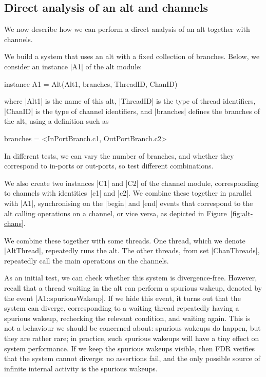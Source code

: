 \subsection{Direct analysis of an alt and channels}
\label{sec:combined}

\inlineCSP

We now describe how we can perform a direct analysis of an alt together with
channels.  




We build a system that uses an alt with a fixed collection of branches.
Below, we consider an instance |A1| of the alt module:
\begin{cspm}
instance A1 = Alt(Alt1, branches, ThreadID, ChanID)
\end{cspm}
where |Alt1| is the name of this alt, |ThreadID| is the type of thread
identifiers, |ChanID| is the type of channel identifiers, and |branches|
defines the branches of the alt,   using a definition such as
%
\begin{cspm}
branches =  <InPortBranch.c1, OutPortBranch.c2>
\end{cspm}
%
In different tests, we can vary the number of branches, and whether they
correspond to in-ports or out-ports, so test different combinations.

We also create two instances |C1| and |C2| of the channel module,
corresponding to channels with identities~|c1| and |c2|.  We combine these
together in parallel with |A1|, synchronising on the |begin| and |end| events
that correspond to the alt calling operations on a channel, or vice versa, as
depicted in Figure~\ref{fig:alt-chans}.

We combine these together with some threads.  One thread, which we denote
|AltThread|, repeatedly runs the alt.  The other threads, from set
|ChanThreads|, repeatedly call the main operations on the channels.

As an initial test, we can check whether this system is divergence-free.
However, recall that a thread waiting in the alt can perform a spurious
wakeup, denoted by the event |A1::spuriousWakeup|.  If we hide this event, it
turns out that the system can diverge, corresponding to a waiting thread
repeatedly having a spurious wakeup, rechecking the relevant condition, and
waiting again.  This is not a behaviour we should be concerned about: spurious
wakeups do happen, but they are rather rare; in practice, such spurious
wakeups will have a tiny effect on system performance.  If we keep the
spurious wakeups visible, then FDR verifies that the system cannot diverge: no
assertions fail, and the only possible source of infinite internal activity is
the spurious wakeups.

